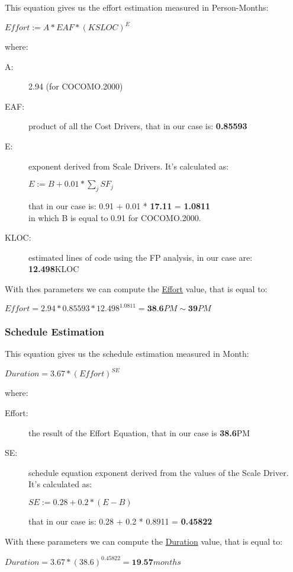 This equation gives us the effort estimation measured in Person-Months:
\begin{center}
	$ Effort := A * EAF * (KSLOC)^{E} $
\end{center}
where:
\begin{description}
	\item [A:] {2.94 (for COCOMO.2000) }
	\item [EAF:] {product of all the Cost Drivers, that in our case is: \textbf{0.85593}} 
	\item [E:] {exponent derived from Scale Drivers. It's calculated as:
		\begin{center}
			$ E := B + 0.01 * \sum_{j} SF_{j} $
		\end{center}
		that in our case is: 0.91 + 0.01 * \textbf{17.11} = \textbf{1.0811}\\ in which B is equal to 0.91 for COCOMO.2000.}
	\item [KLOC:] {estimated lines of code using the FP analysis, in our case are: \textbf{12.498}KLOC}
\end{description}
With thes parameters we can compute the \underline{Effort} value, that is equal to:
\begin{center}
	$ Effort = 2.94 * 0.85593 * 12.498^{1.0811} = \textbf{38.6} PM \sim \textbf{39} PM $
\end{center}

\vfill
\subsubsection{Schedule Estimation}

This equation gives us the schedule estimation measured in Month:
\begin{center}
	$ Duration = 3.67 * (Effort)^{SE}$ 
\end{center}
where: 
\begin{description}
	\item [Effort:] {the result of the Effort Equation, that in our case is \textbf{38.6}PM }
	\item [SE:] {schedule equation exponent derived from the values of the Scale Driver. It's calculated as:
		\begin{center}
			$ SE := 0.28 + 0.2 * (E - B) $
		\end{center}
	that in our case is: 0.28 + 0.2 * 0.8911 = \textbf{0.45822} }
\end{description}
With these parameters we can compute the \underline{Duration} value, that is equal to:
\begin{center}
	$ Duration = 3.67 * (38.6)^{0.45822} = \textbf{19.57} months $ \\
\end{center}